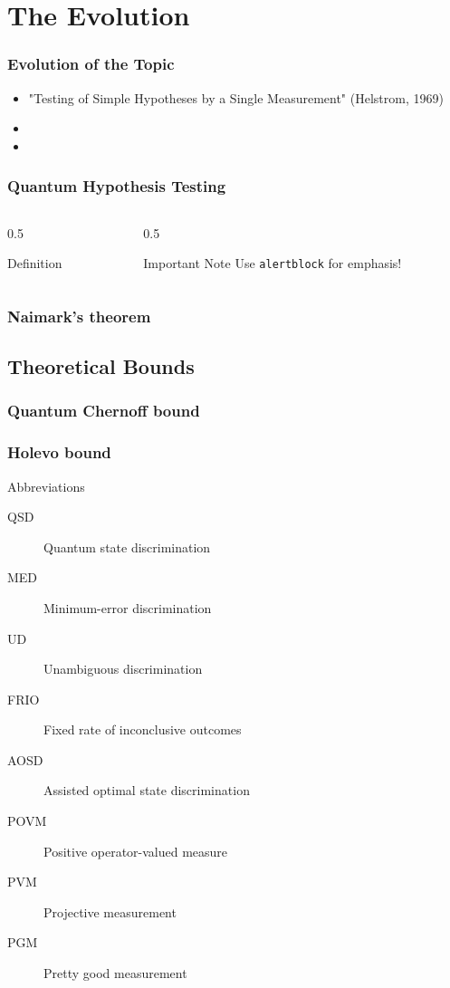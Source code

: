 \documentclass{beamer}
\begin{document}
\section{The Evolution}


\begin{frame}
  \frametitle{Evolution of the Topic}
  \begin{itemize}
    \item<1-> "Testing of Simple Hypotheses by a Single Measurement" (Helstrom, 1969)
    \item<2->
    \item<3->
  \end{itemize}
\end{frame}

\begin{frame}
  \frametitle{Quantum Hypothesis Testing}
  \begin{columns}[T] %
    \begin{column}{0.5\textwidth}
      \begin{block}{Definition}
      \end{block}
    \end{column}
    \begin{column}{0.5\textwidth}
      \begin{alertblock}{Important Note}
        Use \texttt{alertblock} for emphasis!
      \end{alertblock}
    \end{column}
  \end{columns}
\end{frame}

\begin{frame}
  \frametitle{Naimark's theorem}
\end{frame}

\subsection{Theoretical Bounds}
\begin{frame}
  \frametitle{Quantum Chernoff bound}
\end{frame}

\begin{frame}
  \frametitle{Holevo bound}
\end{frame}
\begin{frame}{Abbreviations}
  \begin{description}
    \item[QSD] Quantum state discrimination
    \item[MED] Minimum-error discrimination
    \item[UD] Unambiguous discrimination
    \item[FRIO] Fixed rate of inconclusive outcomes
    \item[AOSD] Assisted optimal state discrimination
    \item[POVM] Positive operator-valued measure
    \item[PVM] Projective measurement
    \item[PGM] Pretty good measurement
  \end{description}
\end{frame}
\end{document}
